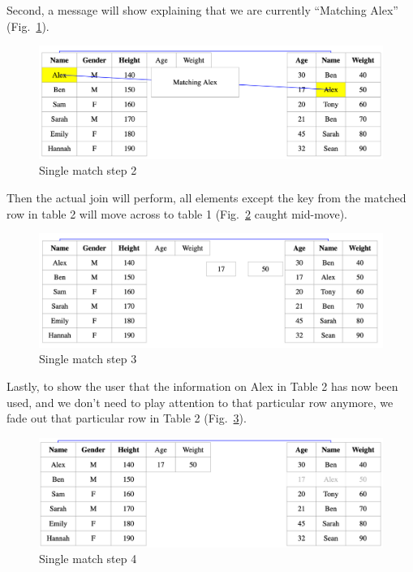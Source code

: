 Second, a message will show explaining that we are currently “Matching Alex” (Fig.~\ref{fig:single2}).

\begin{figure}[H]
    \includegraphics[scale = 0.25]{Masters-Thesis/img/single2.png}
    \caption{Single match step 2}
    \label{fig:single2}
\end{figure}

Then the actual join will perform, all elements except the key from the matched row in table 2 will move across to table 1 (Fig.~\ref{fig:single3} caught mid-move).

\begin{figure}[H]
    \includegraphics[scale = 0.25]{Masters-Thesis/img/single3.png}
    \caption{Single match step 3}
    \label{fig:single3}
\end{figure}

Lastly, to show the user that the information on Alex in Table 2 has now been used, and we don’t need to play attention to that particular row anymore, we fade out that particular row in Table 2 (Fig.~\ref{fig:single4}).

\begin{figure}[H]
    \includegraphics[scale = 0.25]{Masters-Thesis/img/single4.png}
    \caption{Single match step 4}
    \label{fig:single4}
\end{figure}

